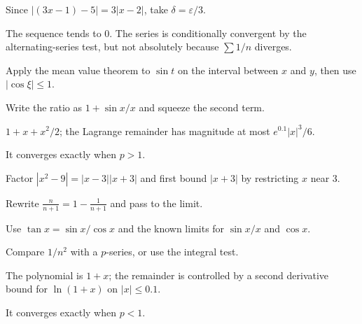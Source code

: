 \begin{selectedhints}
    \item Since $|(3x-1)-5|=3|x-2|$, take $\delta=\varepsilon/3$.
    \item The sequence tends to $0$. The series is conditionally convergent by the alternating-series test, but not absolutely because $\sum1/n$ diverges.
    \item Apply the mean value theorem to $\sin t$ on the interval between $x$ and $y$, then use $|\cos\xi|\le1$.
    \item Write the ratio as $1+\sin x/x$ and squeeze the second term.
    \item $1+x+x^2/2$; the Lagrange remainder has magnitude at most $e^{0.1}|x|^3/6$.
    \item It converges exactly when $p>1$.
    \item Factor $|x^2-9|=|x-3||x+3|$ and first bound $|x+3|$ by restricting $x$ near $3$.
    \item Rewrite $\frac{n}{n+1}=1-\frac{1}{n+1}$ and pass to the limit.
    \item Use $\tan x=\sin x/\cos x$ and the known limits for $\sin x/x$ and $\cos x$.
    \item Compare $1/n^2$ with a $p$-series, or use the integral test.
    \item The polynomial is $1+x$; the remainder is controlled by a second derivative bound for $\ln(1+x)$ on $|x|\le0.1$.
    \item It converges exactly when $p<1$.
\end{selectedhints}
